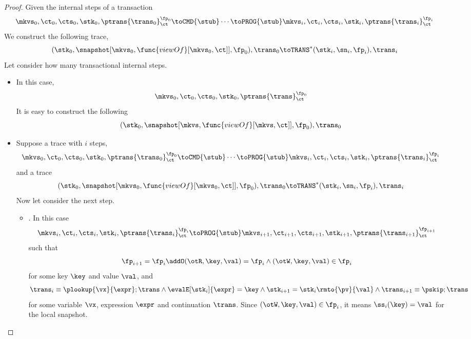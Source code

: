 \begin{proof}
    Given the internal steps of a transaction
    \[
        \mkvs_0, \ct_0, \cts_0, \stk_0, \ptrans{\trans_0}_\ct^{\fp_0} \toCMD{\stub} 
        \cdots  \toPROG{\stub} \mkvs_i, \ct_i, \cts_i, \stk_i, \ptrans{\trans_i}_\ct^{\fp_i}
    \]
    We construct the following trace,
    \[
        (\stk_0, \snapshot[\mkvs_0,\func{viewOf}[\mkvs_0,\ct]], \fp_0), \trans_0 \toTRANS^*
        (\stk_i, \sn_i, \fp_i), \trans_i
    \]
    Let consider how many transactional internal steps.
    \begin{itemize}
        \item {}
        In this case, 
        \[
            \mkvs_0, \ct_0, \cts_0, \stk_0, \ptrans{\trans}_\ct^{\fp_0}
        \]
        It is easy to construct the following
        \[
            (\stk_0, \snapshot[\mkvs,\func{viewOf}[\mkvs,\ct]], \fp_0), \trans_0 
        \]
        \item {}
        Suppose  a trace with \(i\) steps,
        \[
            \mkvs_0, \ct_0, \cts_0, \stk_0, \ptrans{\trans_0}_\ct^{\fp_0} \toCMD{\stub} 
            \cdots  \toPROG{\stub} \mkvs_i, \ct_i, \cts_i, \stk_i, \ptrans{\trans_i}_\ct^{\fp_i}
        \]
        and a trace
        \[
            (\stk_0, \snapshot[\mkvs_0,\func{viewOf}[\mkvs_0,\ct]], \fp_0), \trans_0 \toTRANS^*
            (\stk_i, \sn_i, \fp_i), \trans_i
        \]
        Now let consider the next step.
        \begin{itemize}
            \item {}.
                In this case
                \[
                    \mkvs_i, \ct_i, \cts_i, \stk_i, \ptrans{\trans_i}_\ct^{\fp_i}
                    \toPROG{\stub}
                    \mkvs_{i+1}, \ct_{i+1}, \cts_{i+1}, \stk_{i+1}, \ptrans{\trans_{i+1}}_\ct^{\fp_{i+1}}
                \]
                such that
                \[
                    \fp_{i+1} = \fp_i \addO (\otR, \key, \val)  = \fp_i
                    \land (\otW,\key, \val) \in \fp_i
                \]
                for some key \( \key \) and value \( \val \), and
                \[
                    \trans_{i} \equiv \plookup{\vx}{\expr} ; \trans 
                    \land \evalE[\stk_i]{\expr} = \key 
                    \land \stk_{i+1} = \stk_i\rmto{\pv}{\val}
                    \land  \trans_{i+1} \equiv \pskip ; \trans
                \]
                for some variable \( \vx \), expression \( \expr \) and continuation \( \trans \).
                Since \( ( \otW, \key ,\val ) \in \fp_i  \), it means \( \ss_i(\key) = \val \) for the local snapshot.

\end{itemize}
\end{itemize}
\end{proof}

